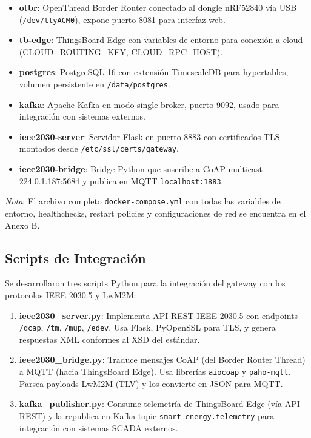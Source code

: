 \begin{itemize}
    \item \textbf{otbr}: OpenThread Border Router conectado al dongle nRF52840 vía USB (\texttt{/dev/ttyACM0}), expone puerto 8081 para interfaz web.
    \item \textbf{tb-edge}: ThingsBoard Edge con variables de entorno para conexión a cloud (CLOUD\_ROUTING\_KEY, CLOUD\_RPC\_HOST).
    \item \textbf{postgres}: PostgreSQL 16 con extensión TimescaleDB para hypertables, volumen persistente en \texttt{/data/postgres}.
    \item \textbf{kafka}: Apache Kafka en modo single-broker, puerto 9092, usado para integración con sistemas externos.
    \item \textbf{ieee2030-server}: Servidor Flask en puerto 8883 con certificados TLS montados desde \texttt{/etc/ssl/certs/gateway}.
    \item \textbf{ieee2030-bridge}: Bridge Python que suscribe a CoAP multicast 224.0.1.187:5684 y publica en MQTT \texttt{localhost:1883}.
\end{itemize}

\textit{Nota}: El archivo completo \texttt{docker-compose.yml} con todas las variables de entorno, healthchecks, restart policies y configuraciones de red se encuentra en el Anexo B.

\subsection{Scripts de Integración}

Se desarrollaron tres scripts Python para la integración del gateway con los protocolos IEEE 2030.5 y LwM2M:

\begin{enumerate}
    \item \textbf{ieee2030\_server.py}: Implementa API REST IEEE 2030.5 con endpoints \texttt{/dcap}, \texttt{/tm}, \texttt{/mup}, \texttt{/edev}. Usa Flask, PyOpenSSL para TLS, y genera respuestas XML conformes al XSD del estándar.
    
    \item \textbf{ieee2030\_bridge.py}: Traduce mensajes CoAP (del Border Router Thread) a MQTT (hacia ThingsBoard Edge). Usa librerías \texttt{aiocoap} y \texttt{paho-mqtt}. Parsea payloads LwM2M (TLV) y los convierte en JSON para MQTT.
    
    \item \textbf{kafka\_publisher.py}: Consume telemetría de ThingsBoard Edge (vía API REST) y la republica en Kafka topic \texttt{smart-energy.telemetry} para integración con sistemas SCADA externos.
\end{enumerate}

